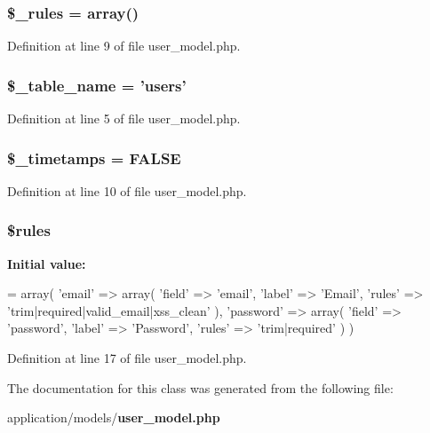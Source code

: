 \subsubsection[{\$\-\_\-rules}]{\setlength{\rightskip}{0pt plus 5cm}\$\-\_\-rules = array()\hspace{0.3cm}{\ttfamily [protected]}}\label{class_user__model_a2432b65e7e8b8a8328a1c47ab6ca0409}


Definition at line 9 of file user\-\_\-model.\-php.

\subsubsection[{\$\-\_\-table\-\_\-name}]{\setlength{\rightskip}{0pt plus 5cm}\$\-\_\-table\-\_\-name = 'users'\hspace{0.3cm}{\ttfamily [protected]}}\label{class_user__model_a90ebc25e748e2696e00b5c5cf3255ee4}


Definition at line 5 of file user\-\_\-model.\-php.

\subsubsection[{\$\-\_\-timetamps}]{\setlength{\rightskip}{0pt plus 5cm}\$\-\_\-timetamps = F\-A\-L\-S\-E\hspace{0.3cm}{\ttfamily [protected]}}\label{class_user__model_a0af45edfd9d801cbc582a244700cd824}


Definition at line 10 of file user\-\_\-model.\-php.

\subsubsection[{\$rules}]{\setlength{\rightskip}{0pt plus 5cm}\$rules}\label{class_user__model_a811d22ac55b4592f7f2a202529629419}
{\bfseries Initial value\-:}
\begin{DoxyCode}
= array(
        \textcolor{stringliteral}{'email'} => array(
            \textcolor{stringliteral}{'field'} => \textcolor{stringliteral}{'email'}, 
            \textcolor{stringliteral}{'label'} => \textcolor{stringliteral}{'Email'}, 
            \textcolor{stringliteral}{'rules'} => \textcolor{stringliteral}{'trim|required|valid\_email|xss\_clean'}
        ), 
        \textcolor{stringliteral}{'password'} => array(
            \textcolor{stringliteral}{'field'} => \textcolor{stringliteral}{'password'}, 
            \textcolor{stringliteral}{'label'} => \textcolor{stringliteral}{'Password'}, 
            \textcolor{stringliteral}{'rules'} => \textcolor{stringliteral}{'trim|required'}
        )
    )
\end{DoxyCode}


Definition at line 17 of file user\-\_\-model.\-php.



The documentation for this class was generated from the following file\-:\begin{DoxyCompactItemize}
\item 
application/models/{\bf user\-\_\-model.\-php}\end{DoxyCompactItemize}
